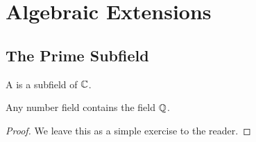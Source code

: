 \newpage
\section{Algebraic Extensions}

\subsection{The Prime Subfield}

\begin{defn}
    A  is a subfield of $\mathbb{C}$.
\end{defn}
\begin{prop}
    Any number field contains the field $\mathbb{Q}$.
\end{prop}
\begin{proof}
    We leave this as a simple exercise to the reader. 
\end{proof}

